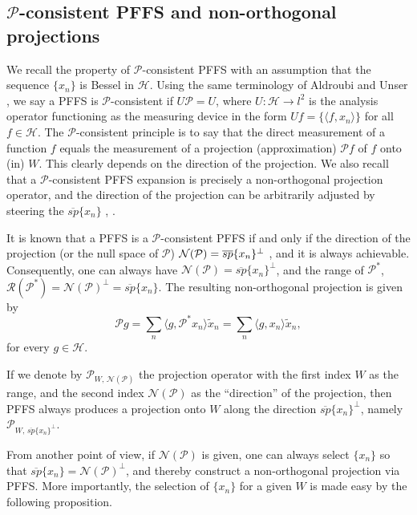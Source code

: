 \documentclass[11pt,reqno]{amsart}
\theoremstyle{remark}
\begin{document}
\subsection{${{\mathcal P}}$-consistent PFFS and non-orthogonal projections}

We recall the property of ${{\mathcal P}}$-consistent PFFS with an assumption that the sequence $\{x_n\}$ is Bessel in ${\mathcal H}$.  Using the same terminology of Aldroubi and Unser \cite{UnserAldroubi94}, we say a PFFS is ${{\mathcal P}}$-consistent \cite{LiOg_noiseSuppression} if
$U{{\mathcal P}}=U$, where $U:{\mathcal H}\rightarrow l^2$ is the analysis operator functioning as the measuring device in the form $U f =\{{\langle} f, x_n{\rangle}\}$ for all $f\in{\mathcal H}$.  The ${{\mathcal P}}$-consistent principle is to say that the direct measurement of a function $f$ equals the measurement of a projection (approximation) ${{\mathcal P}} f$ of $f$ onto (in) $W$.   This clearly depends on the direction of the projection.  We also recall that a ${{\mathcal P}}$-consistent PFFS expansion is precisely a non-orthogonal projection operator, and the direction of the projection can be arbitrarily adjusted by steering the ${\overline{sp}}\{x_n\}$ \cite{LiOgPFFS98}, \cite{LiOg_noiseSuppression}.

It is known that a PFFS is a ${{\mathcal P}}$-consistent PFFS if and only if the direction of the projection (or the null space of ${{\mathcal P}}$) ${\displaystyle}{{\mathcal N}}({{\mathcal P}})={\overline{sp}}\{x_n\}^{\perp}$ \cite{LiOg_noiseSuppression}, and it is always achievable.
Consequently, one can always have ${{\mathcal N}}({{\mathcal P}})={\overline{sp}}\{x_n\}^{\perp}$, and the range of ${{\mathcal P}}^*$, ${{\mathcal R}}({{\mathcal P}}^*)={{\mathcal N}}({{\mathcal P}})^{\perp}={\overline{sp}}\{x_n\}$.  The resulting non-orthogonal projection is given by
\[
{{\mathcal P}} g  = \sum_n{\langle} g,{{\mathcal P}}^* x_n{\rangle} \tilde x_n = \sum_n{\langle} g, x_n{\rangle} \tilde x_n,
\]
for every $g\in\mathcal{H}$.

If we denote by ${{\mathcal P}}_{W,\, {{\mathcal N}}({{\mathcal P}})}$ the projection operator with the first index $W$ as the range, and the second index ${{\mathcal N}}({{\mathcal P}})$  as the ``direction'' of the projection, then PFFS always produces a projection onto $W$ along the direction ${\overline{sp}}\{x_n\}^{\perp}$, namely ${{\mathcal P}}_{W,\, {\overline{sp}}\{x_n\}^{\perp}}$.

From another point of view, if ${{\mathcal N}}({{\mathcal P}})$ is given, one can always select $\{x_n\}$ so that ${\overline{sp}}\{x_n\}={{\mathcal N}}({{\mathcal P}})^{\perp}$, and thereby construct a non-orthogonal projection via PFFS.  More importantly, the selection of $\{x_n\}$ for a given $W$ is made easy by the following proposition.
\end{document}
